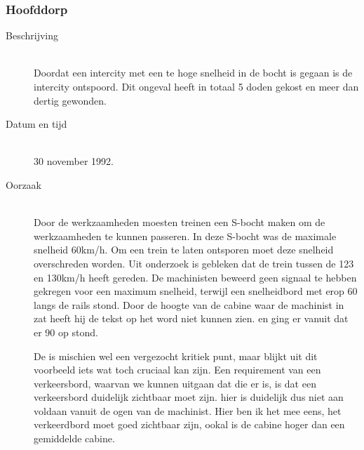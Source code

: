 \documentclass{article}%
\begin{document}
\clearpage %




\subsubsection{Hoofddorp}
\begin{description}
\item [Beschrijving] \hfill \\
Doordat een intercity met een te hoge snelheid in de bocht is gegaan is de intercity ontspoord. Dit ongeval heeft in totaal 5 doden gekost en meer dan dertig gewonden.

\item [Datum en tijd] \hfill \\
30 november 1992.

\item [Oorzaak] \hfill \\
Door de werkzaamheden moesten treinen een S-bocht maken om de werkzaamheden te kunnen passeren. In deze S-bocht was de maximale snelheid 60km/h. Om een trein te laten ontsporen moet deze snelheid overschreden worden. Uit onderzoek is gebleken dat de trein tussen de 123 en 130km/h heeft gereden. De machinisten beweerd geen signaal te hebben gekregen voor een maximum snelheid, terwijl een snelheidbord met erop 60 langs de rails stond. Door de hoogte van de cabine waar de machinist in zat heeft hij de tekst op het word niet kunnen zien. en ging er vanuit dat er 90 op stond.

De is mischien wel een vergezocht kritiek punt, maar blijkt uit dit voorbeeld iets wat toch cruciaal kan zijn. Een requirement van een verkeersbord, waarvan we kunnen uitgaan dat die er is, is dat een verkeersbord duidelijk zichtbaar moet zijn. hier is duidelijk dus niet aan voldaan vanuit de ogen van de machinist. Hier ben ik het mee eens, het verkeerdbord moet goed zichtbaar zijn, ookal is de cabine hoger dan een gemiddelde cabine.

\end{description}





\clearpage %
\end{document}

